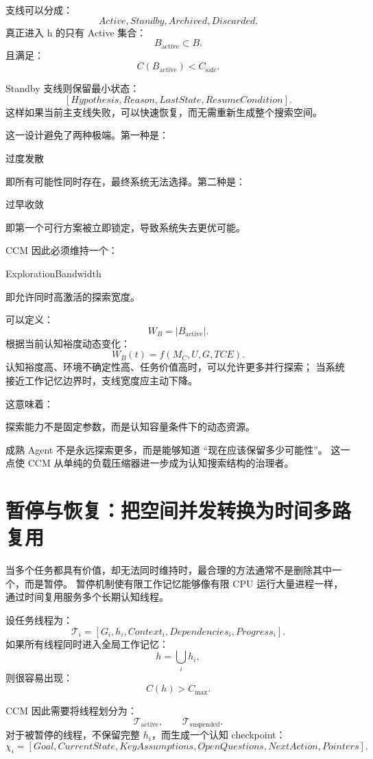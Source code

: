 支线可以分成：
\[
Active,
Standby,
Archived,
Discarded.
\]
真正进入 h 的只有 Active 集合：
\[
B_{\mathrm{active}}
\subset B.
\]
且满足：
\[
C(B_{\mathrm{active}})
<
C_{\mathrm{safe}}.
\]

Standby 支线则保留最小状态：
\[
[
Hypothesis,
Reason,
LastState,
ResumeCondition
].
\]
这样如果当前主支线失败，可以快速恢复，而无需重新生成整个搜索空间。

这一设计避免了两种极端。第一种是：
\begin{statementbox}
过度发散
\end{statementbox}
即所有可能性同时存在，最终系统无法选择。第二种是：
\begin{statementbox}
过早收敛
\end{statementbox}
即第一个可行方案被立即锁定，导致系统失去更优可能。

CCM 因此必须维持一个：
\begin{statementbox}
ExplorationBandwidth
\end{statementbox}
即允许同时高激活的探索宽度。

可以定义：
\[
W_B
=
|B_{\mathrm{active}}|.
\]
根据当前认知裕度动态变化：
\[
W_B(t)
=
f(M_C,U,G,TCE).
\]
认知裕度高、环境不确定性高、任务价值高时，可以允许更多并行探索；
当系统接近工作记忆边界时，支线宽度应主动下降。

这意味着：
\begin{statementbox}
探索能力不是固定参数，而是认知容量条件下的动态资源。
\end{statementbox}

成熟 Agent 不是永远探索更多，而是能够知道 ``现在应该保留多少可能性''。
这一点使 CCM 从单纯的负载压缩器进一步成为认知搜索结构的治理者。


\section{暂停与恢复：把空间并发转换为时间多路复用}

当多个任务都具有价值，却无法同时维持时，最合理的方法通常不是删除其中一个，而是暂停。
暂停机制使有限工作记忆能够像有限 CPU 运行大量进程一样，通过时间复用服务多个长期认知线程。

设任务线程为：
\[
\mathcal T_i
=
[
G_i,
h_i,
Context_i,
Dependencies_i,
Progress_i
].
\]
如果所有线程同时进入全局工作记忆：
\[
h
=
\bigcup_i h_i,
\]
则很容易出现：
\[
C(h)>C_{\max}.
\]

CCM 因此需要将线程划分为：
\[
\mathcal T_{\mathrm{active}},
\qquad
\mathcal T_{\mathrm{suspended}}.
\]
对于被暂停的线程，不保留完整 $h_i$，而生成一个认知 checkpoint：
\[
\chi_i
=
[
Goal,
CurrentState,
KeyAssumptions,
OpenQuestions,
NextAction,
Pointers
].
\]

